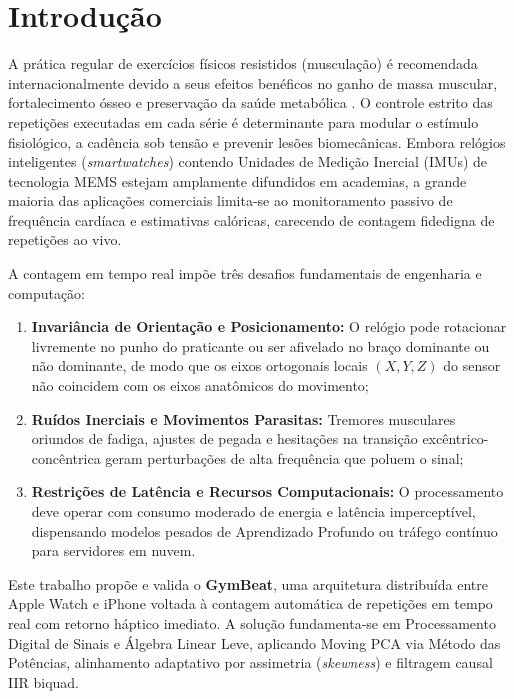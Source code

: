 \documentclass[12pt]{article}
\begin{document}
\section{Introdução}

A prática regular de exercícios físicos resistidos (musculação) é recomendada internacionalmente devido a seus efeitos benéficos no ganho de massa muscular, fortalecimento ósseo e preservação da saúde metabólica \cite{acsm2018}. O controle estrito das repetições executadas em cada série é determinante para modular o estímulo fisiológico, a cadência sob tensão e prevenir lesões biomecânicas. Embora relógios inteligentes (\textit{smartwatches}) contendo Unidades de Medição Inercial (IMUs) de tecnologia MEMS estejam amplamente difundidos em academias, a grande maioria das aplicações comerciais limita-se ao monitoramento passivo de frequência cardíaca e estimativas calóricas, carecendo de contagem fidedigna de repetições ao vivo.

A contagem em tempo real impõe três desafios fundamentais de engenharia e computação:
\begin{enumerate}
    \setlength{\itemsep}{0pt}
    \setlength{\parskip}{0pt}
    \item \textbf{Invariância de Orientação e Posicionamento:} O relógio pode rotacionar livremente no punho do praticante ou ser afivelado no braço dominante ou não dominante, de modo que os eixos ortogonais locais $(X, Y, Z)$ do sensor não coincidem com os eixos anatômicos do movimento;
    \item \textbf{Ruídos Inerciais e Movimentos Parasitas:} Tremores musculares oriundos de fadiga, ajustes de pegada e hesitações na transição excêntrico-concêntrica geram perturbações de alta frequência que poluem o sinal;
    \item \textbf{Restrições de Latência e Recursos Computacionais:} O processamento deve operar com consumo moderado de energia e latência imperceptível, dispensando modelos pesados de Aprendizado Profundo ou tráfego contínuo para servidores em nuvem.
\end{enumerate}

Este trabalho propõe e valida o \textbf{GymBeat}, uma arquitetura distribuída entre Apple Watch e iPhone voltada à contagem automática de repetições em tempo real com retorno háptico imediato. A solução fundamenta-se em Processamento Digital de Sinais e Álgebra Linear Leve, aplicando Moving PCA via Método das Potências, alinhamento adaptativo por assimetria (\textit{skewness}) e filtragem causal IIR biquad.
\end{document}
